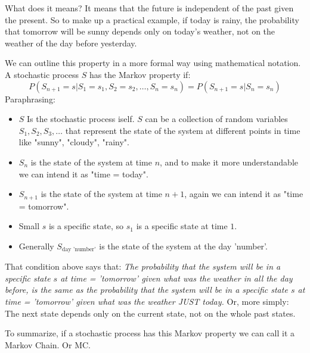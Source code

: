 \documentclass[a4paper]{article}
\begin{document}
What does it means? It means that the future is independent of the past given the present. So to make up a practical example, if today is rainy, the probability that tomorrow will be sunny depends only on today's weather, not on the weather of the day before yesterday.

We can outline this property in a more formal way using mathematical notation. A stochastic process $S$ has the Markov property if:
$$P(S_{n+1} = s | S_1 = s_1, S_2 = s_2, \ldots, S_n = s_n) = P(S_{n+1} = s | S_n = s_n)$$
Paraphrasing: \begin{itemize}
    \item $S$ Is the stochastic process iself. $S$ can be a collection of random variables $S_1, S_2, S_3, \ldots$ that represent the state of the system at different points in time like "sunny", "cloudy", "rainy". 
    \item $S_n$ is the state of the system at time $n$, and to make it more understandable we can intend it as "time = today".
    \item $S_{n+1}$ is the state of the system at time $n+1$, again we can intend it as "time = tomorrow".
    \item Small $s$ is a specific state, so $s_1$ is a specific state at time $1$.
    \item Generally $S_{\text{day 'number'}}$ is the state of the system at the day 'number'.
\end{itemize}
That condition above says that: \textit{The probability that the system will be in a specific state $s$ at time = 'tomorrow' given what was the weather in all the day before, is the same as the probability that the system will be in a specific state $s$ at time = 'tomorrow' given what was the weather JUST today.}
Or, more simply: The next state depends only on the current state, not on the whole past states.

To summarize, if a stochastic process has this Markov property we can call it a Markov Chain. Or MC.
\end{document}
